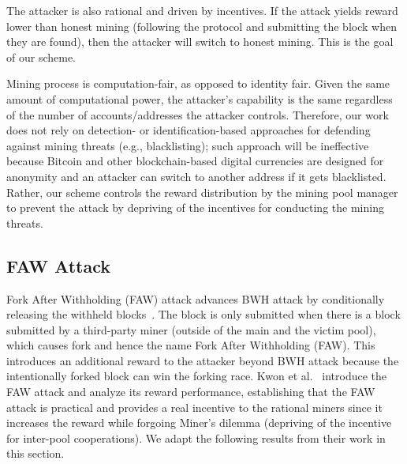 The attacker is also rational and driven by incentives. 
If the attack yields reward lower than honest mining (following the protocol and submitting the block when they are found), then the attacker will switch to honest mining. 
This is the goal of our scheme. 


Mining process is computation-fair, as opposed to identity fair.
Given the same amount of computational power, the attacker's capability is the same regardless of the number of accounts/addresses the attacker controls.
Therefore, our work does not rely on detection- or identification-based approaches for defending against mining threats (e.g., blacklisting);
such approach will be ineffective because Bitcoin and other blockchain-based digital currencies are designed for anonymity and an attacker can switch to another address if it gets blacklisted.
Rather, our scheme controls the reward distribution by the mining pool manager to prevent the attack by depriving of the incentives for conducting the mining threats.

\subsection{FAW Attack}
\label{subsec:faw_attack}
Fork After Withholding (FAW) attack advances BWH attack by conditionally releasing the withheld blocks~\cite{b4}.
The block is only submitted when there is a block submitted by a third-party miner (outside of the main and the victim pool), which causes fork and hence the name Fork After Withholding (FAW).
This introduces an additional reward to the attacker beyond BWH attack because the intentionally forked block can win the forking race.
Kwon et al.~\cite{b4} introduce the FAW attack and analyze its reward performance, establishing that the FAW attack is practical and provides a real incentive to the rational miners since it increases the reward while forgoing Miner's dilemma (depriving of the incentive for inter-pool cooperations).
We adapt the following results from their work in this section.

